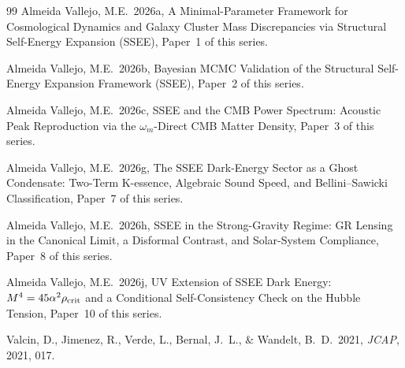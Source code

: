 \documentclass[12pt,a4paper]{article}
\begin{document}
\begin{thebibliography}{99}
Almeida Vallejo, M.E.\ 2026a, A Minimal-Parameter Framework for Cosmological
Dynamics and Galaxy Cluster Mass Discrepancies via Structural Self-Energy
Expansion (SSEE), Paper~1 of this series.

Almeida Vallejo, M.E.\ 2026b, Bayesian MCMC Validation of the Structural
Self-Energy Expansion Framework (SSEE), Paper~2 of this series.

Almeida Vallejo, M.E.\ 2026c, SSEE and the CMB Power Spectrum: Acoustic Peak
Reproduction via the $\omega_m$-Direct CMB Matter Density, Paper~3 of this series.

Almeida Vallejo, M.E.\ 2026g, The SSEE Dark-Energy Sector as a Ghost
Condensate: Two-Term K-essence, Algebraic Sound Speed, and Bellini--Sawicki
Classification, Paper~7 of this series.

Almeida Vallejo, M.E.\ 2026h, SSEE in the Strong-Gravity Regime: GR Lensing in
the Canonical Limit, a Disformal Contrast, and Solar-System Compliance, Paper~8
of this series.

Almeida Vallejo, M.E.\ 2026j, UV Extension of SSEE Dark Energy:
$M^4 = 45\alpha^2\rho_{\rm crit}$ and a Conditional Self-Consistency Check on the
Hubble Tension, Paper~10 of this series.

Valcin, D., Jimenez, R., Verde, L., Bernal, J.~L., \& Wandelt, B.~D.\ 2021,
\textit{JCAP}, 2021, 017.

\end{thebibliography}

\end{document}
